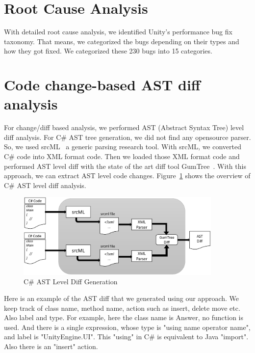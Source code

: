 \section{Root Cause Analysis}
\label{sec:rootcause}
With detailed root cause analysis, we identified Unity's performance bug fix taxonomy. That means, we categorized the bugs depending on their types and how they got fixed. We categorized these 230 bugs into 15 categories.






\section{Code change-based AST diff analysis}
\label{sec:diffanalysis}
For change/diff based analysis, we performed AST (Abstract Syntax Tree) level diff analysis. For C\# AST tree generation, we did not find any opensource parser. So, we  used srcML~\cite{srcML} a generic parsing research tool. With srcML, we converted C\# code into XML format code. Then we loaded those XML format code and performed AST level diff with the state of the art diff tool GumTree~\cite{Jean:gumtree:2014}. With this approach, we can extract AST level code changes. Figure~\ref{figure:astdiff} shows the overview of C\# AST level diff analysis.

\begin{figure}[t]
	\centering
	\includegraphics[width=0.9\textwidth]{figure/diff_overview.eps}
	\caption{C\# AST Level Diff Generation}
	\label{figure:astdiff}
\end{figure}

Here is an example of the AST diff that we generated using our approach. We keep track of class name, method name, action such as insert, delete move etc. Also label and type. For example, here the class name is Answer, no function is used. And there is a single expression, whose type is "using name operator name", and label is "UnityEngine.UI". This "using" in C\# is equivalent to Java "import". Also there is an "insert" action. 


